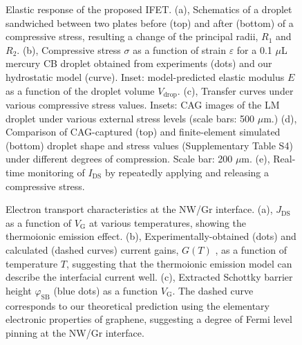 \begin{figure}[htbp]
\centering
\caption{\label{fig:small-main-4}
Elastic response of the proposed IFET. (a), Schematics of a droplet sandwiched between two plates before (top) and after (bottom) of a compressive stress, resulting a change of the principal radii, \(R_{1}\) and \(R_{2}\). (b), Compressive stress \(\sigma\) as a function of strain \(\varepsilon\) for a 0.1 \(\mu\)L mercury CB droplet obtained from experiments (dots) and our hydrostatic model (curve). Inset: model-predicted elastic modulus \(E\) as a function of the droplet volume \(V_{\mathrm{drop}}\). (c), Transfer curves under various compressive stress values. Insets: CAG images of the LM droplet under various external stress levels (scale bars: 500 \(\mu\)m.) (d), Comparison of CAG-captured (top) and finite-element simulated (bottom) droplet shape and stress values (Supplementary Table S4) under different degrees of compression. Scale bar: 200 \(\mu\)m. (e), Real-time monitoring of \(I_{\mathrm{DS}}\) by repeatedly applying and releasing a compressive stress.}
\end{figure}


\begin{figure}[htbp]
\centering
\caption{\label{fig:small-main-5}
Electron transport characteristics at the NW/Gr interface. (a), \(J_{\mathrm{DS}}\) as a function of \(V_{\mathrm{G}}\) at various temperatures, showing the thermoionic emission effect. (b), Experimentally-obtained (dots) and calculated (dashed curves) current gains, \(G(T)\) , as a function of temperature \(T\), suggesting that the thermoionic emission model can describe the interfacial current well. (c), Extracted Schottky barrier height \(\varphi_{\mathrm{SB}}\) (blue dots) as a function \(V_{\mathrm{G}}\). The dashed curve corresponds to our theoretical prediction using the elementary electronic properties of graphene, suggesting a degree of Fermi level pinning at the NW/Gr interface.}
\end{figure}



